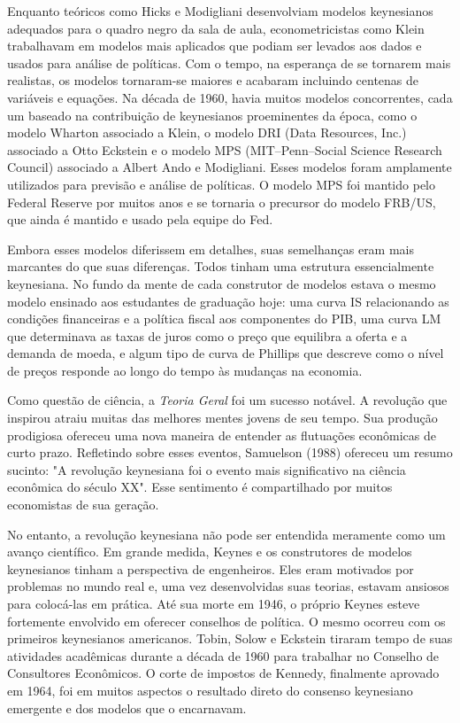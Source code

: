 \documentclass[12pt]{article}
\begin{document}
Enquanto teóricos como Hicks e Modigliani desenvolviam modelos keynesianos adequados para o quadro negro da sala de aula, econometricistas como Klein trabalhavam em modelos mais aplicados que podiam ser levados aos dados e usados para análise de políticas. Com o tempo, na esperança de se tornarem mais realistas, os modelos tornaram-se maiores e acabaram incluindo centenas de variáveis e equações. Na década de 1960, havia muitos modelos concorrentes, cada um baseado na contribuição de keynesianos proeminentes da época, como o modelo Wharton associado a Klein, o modelo DRI (Data Resources, Inc.) associado a Otto Eckstein e o modelo MPS (MIT–Penn–Social Science Research Council) associado a Albert Ando e Modigliani. Esses modelos foram amplamente utilizados para previsão e análise de políticas. O modelo MPS foi mantido pelo Federal Reserve por muitos anos e se tornaria o precursor do modelo FRB/US, que ainda é mantido e usado pela equipe do Fed.

Embora esses modelos diferissem em detalhes, suas semelhanças eram mais marcantes do que suas diferenças. Todos tinham uma estrutura essencialmente keynesiana. No fundo da mente de cada construtor de modelos estava o mesmo modelo ensinado aos estudantes de graduação hoje: uma curva IS relacionando as condições financeiras e a política fiscal aos componentes do PIB, uma curva LM que determinava as taxas de juros como o preço que equilibra a oferta e a demanda de moeda, e algum tipo de curva de Phillips que descreve como o nível de preços responde ao longo do tempo às mudanças na economia.

Como questão de ciência, a \textit{Teoria Geral} foi um sucesso notável. A revolução que inspirou atraiu muitas das melhores mentes jovens de seu tempo. Sua produção prodigiosa ofereceu uma nova maneira de entender as flutuações econômicas de curto prazo. Refletindo sobre esses eventos, Samuelson (1988) ofereceu um resumo sucinto: "A revolução keynesiana foi o evento mais significativo na ciência econômica do século XX". Esse sentimento é compartilhado por muitos economistas de sua geração.

No entanto, a revolução keynesiana não pode ser entendida meramente como um avanço científico. Em grande medida, Keynes e os construtores de modelos keynesianos tinham a perspectiva de engenheiros. Eles eram motivados por problemas no mundo real e, uma vez desenvolvidas suas teorias, estavam ansiosos para colocá-las em prática. Até sua morte em 1946, o próprio Keynes esteve fortemente envolvido em oferecer conselhos de política. O mesmo ocorreu com os primeiros keynesianos americanos. Tobin, Solow e Eckstein tiraram tempo de suas atividades acadêmicas durante a década de 1960 para trabalhar no Conselho de Consultores Econômicos. O corte de impostos de Kennedy, finalmente aprovado em 1964, foi em muitos aspectos o resultado direto do consenso keynesiano emergente e dos modelos que o encarnavam.
\end{document}
